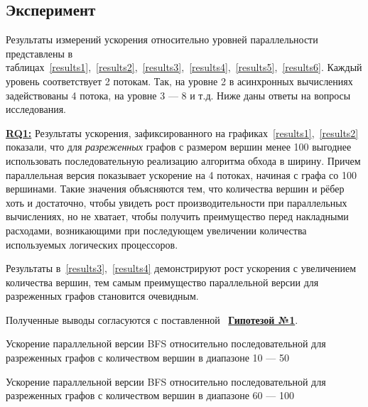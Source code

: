\subsection{Эксперимент}
Результаты измерений ускорения относительно уровней параллельности представлены в таблицах~\ref{results1},~\ref{results2},~\ref{results3},~\ref{results4},~\ref{results5},~\ref{results6}. Каждый уровень соответствует 2 потокам. Так, на уровне 2 в асинхронных вычислениях задействованы 4 потока, на уровне 3 --- 8 и т.д. 
Ниже даны ответы на вопросы исследования.
\newline

\hyperref[rq1]{\textbf{RQ1:}}
Результаты ускорения, зафиксированного на графиках~\ref{results1},~\ref{results2} показали, что для \emph{разреженных} графов с размером вершин менее 100 выгоднее использовать последовательную реализацию алгоритма обхода в ширину. Причем параллельная версия показывает ускорение на 4 потоках, начиная с графа со 100 вершинами. Такие значения объясняются тем, что количества вершин и рёбер хоть и достаточно, чтобы увидеть рост производительности при параллельных вычислениях, но не хватает, чтобы получить преимущество перед накладными расходами, возникающими при последующем увеличении количества используемых логических процессоров. 

Результаты в~\ref{results3},~\ref{results4} демонстрируют рост ускорения с увеличением количества вершин, тем самым преимущество параллельной версии для разреженных графов становится очевидным.

Полученные выводы согласуются с поставленной ~\hyperref[t1]{\textbf{Гипотезой №1}}.
\newline

\begin{table}
  \centering

\caption{Ускорение параллельной версии BFS относительно последовательной для разреженных графов с количеством вершин в диапазоне 10 --- 50}
\label{results1}
\end{table}

\begin{table}
  \centering

\caption{Ускорение параллельной версии BFS относительно последовательной для разреженных графов с количеством вершин в диапазоне 60 --- 100}
\label{results2}
\end{table}

